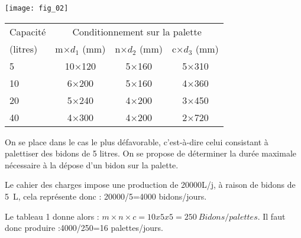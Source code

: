 \vspace{.4cm}
\begin{minipage}[c]{.42\linewidth}
\begin{center}
\texttt{[image: fig\_02]}
\end{center}
\end{minipage} \hfill
\begin{minipage}[c]{.55\linewidth}
\begin{center}
\begin{tabular}{lccc}
\hline
Capacité & \multicolumn{3}{c}{Conditionnement sur la palette} \\
(litres) 	& m×$d_1$ (mm)	& n×$d_2$ (mm)	& c×$d_3$ (mm)  \\
\hline
5	& 10×120	& 5×160	& 5×310 \\
10	& 6×200	& 5×160	& 4×360 \\
20	& 5×240	& 4×200	& 3×450 \\
40	& 4×300	& 4×200	& 2×720 \\
\hline
\end{tabular}
\end{center} 

\end{minipage}

\vspace{.4cm}


On se place dans le cas le plus défavorable, c'est-à-dire celui consistant à 
palettiser des bidons de 5 litres. On se propose de déterminer la durée maximale nécessaire à 
la dépose d’un bidon sur la palette. 
\fi

\ifprof
\begin{corrige}
Le cahier des charges impose une production de 20000\si{L/j}, à raison de bidons de \SI{5}{L}, cela 
représente donc : 20000/5=4000 bidons/jours.
\end{corrige}
\else
\fi

\ifprof
\begin{corrige}
Le tableau 1 donne alors : $m\times n \times c=10x5x5=\SI{250}{Bidons/palettes}$. 
Il faut donc produire :4000/250=16 palettes/jours.
\end{corrige}
\else
\fi


